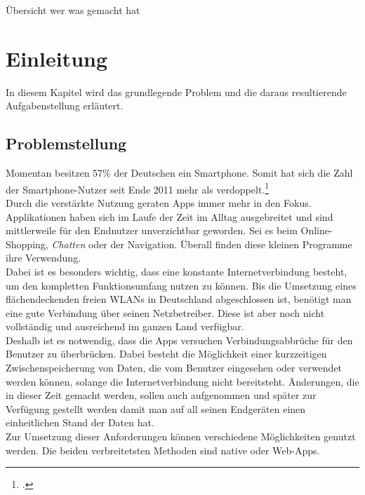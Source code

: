 Übersicht wer was gemacht hat

\chapter{Einleitung}
\label{cha:einleitung}
In diesem Kapitel wird das grundlegende Problem und die daraus resultierende Aufgabenstellung erläutert.

\section{Problemstellung}
\label{sec:problemstellung}
Momentan besitzen 57\% der Deutschen ein Smartphone. Somit hat sich die Zahl der Smartphone-Nutzer seit Ende 2011 mehr als verdoppelt.\footcite{Statista-SmartphoneNutzung}\\
Durch die verstärkte Nutzung geraten \glspl{App} immer mehr in den Fokus. Applikationen haben sich im Laufe der Zeit im Alltag ausgebreitet und sind mittlerweile für den Endnutzer unverzichtbar geworden. Sei es beim Online-Shopping, \textit{Chatten} oder der Navigation. Überall finden diese kleinen Programme ihre Verwendung.\\
Dabei ist es besonders wichtig, dass eine konstante Internetverbindung besteht, um den kompletten Funktionsumfang nutzen zu können. Bis die Umsetzung eines flächendeckenden freien WLANs in Deutschland abgeschlossen ist, benötigt man eine gute Verbindung über seinen Netzbetreiber. Diese ist aber noch nicht vollständig und ausreichend im ganzen Land verfügbar.\\
Deshalb ist es notwendig, dass die Apps versuchen Verbindungsabbrüche für den Benutzer zu überbrücken. Dabei besteht die Möglichkeit einer kurzzeitigen Zwischenspeicherung von Daten, die vom Benutzer eingesehen oder verwendet werden können, solange die Internetverbindung nicht bereitsteht. Änderungen, die in dieser Zeit gemacht werden, sollen auch aufgenommen und später zur Verfügung gestellt werden damit man auf all seinen Endgeräten einen einheitlichen Stand der Daten hat.\\
Zur Umsetzung dieser Anforderungen können verschiedene Möglichkeiten genutzt werden. Die beiden verbreitetsten Methoden sind native oder Web-Apps.
